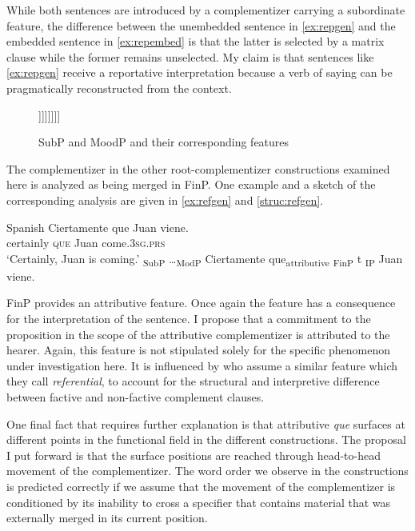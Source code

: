 While both  sentences are introduced by a complementizer carrying a subordinate feature, the difference between the unembedded sentence in \eqref{ex:repgen} and the embedded sentence in \eqref{ex:repembed}   is that the latter  is selected by a matrix clause while  the former  remains unselected. My claim is that sentences like \eqref{ex:repgen} receive a reportative interpretation because a verb of saying can be pragmatically reconstructed from the  context.\largerpage[-1]
 
\begin{figure}
  \caption{\label{struc:general}SubP and MoodP and their corresponding features}
\begin{forest}
	[SubP
	[~] 
	[Sub' 
	[Sub$^0_{\text{subordinate}}$, name=sub]  
	[\dots
	[,phantom]
	[MoodP
	[~] 
	[Mood'
	[Mood$^0_{\text{declarative/imperative/interrogative}}$, name=mood] 
	[FinP
	[~] 
	[Fin' 
	[Fin$^0_{\text{attributive}}$, name=fin] 
	[IP
		]]]]]]]]	
\end{forest}
\end{figure} 

The complementizer in the other root-complementizer constructions examined here is analyzed as being merged in FinP. One example and a sketch of the corresponding analysis are given in \eqref{ex:refgen} and \eqref{struc:refgen}.

\ea Spanish
\ea \label{ex:refgen} 
\gll Ciertamente que Juan viene. \\
	certainly \textsc{que} Juan come.\textsc{3sg.prs}\\
	\glt`Certainly, Juan is coming.'
	\ex\label{struc:refgen} {\ob}\textsubscript{SubP} \dots {\ob}\textsubscript{ModP} Ciertamente que\textsubscript{attributive} {\ob}\textsubscript{FinP} t {\ob}\textsubscript{IP} Juan viene. {\cb}{\cb}{\cb}{\cb}
\z
\z

FinP provides an attributive feature. Once again the feature has a consequence for the interpretation of the sentence. I propose that a commitment to the proposition in the scope of the attributive complementizer  is attributed to the hearer.  Again, this feature is not stipulated  solely  for the specific phenomenon under investigation here. It is influenced by \citet{Cuba2013} who assume a similar     feature which they call \emph{referential}, to account for the structural and interpretive difference between factive and non-factive complement clauses.

One final fact that requires further explanation is that attributive \emph{que} surfaces at different points in the functional field in the different constructions. The proposal I put forward  is that the surface positions are reached through head-to-head movement of the complementizer. The word order we observe in the constructions is predicted correctly if we assume that the movement of the complementizer is conditioned by  its inability to cross a specifier that contains  material that was externally merged in its current position.  
 
